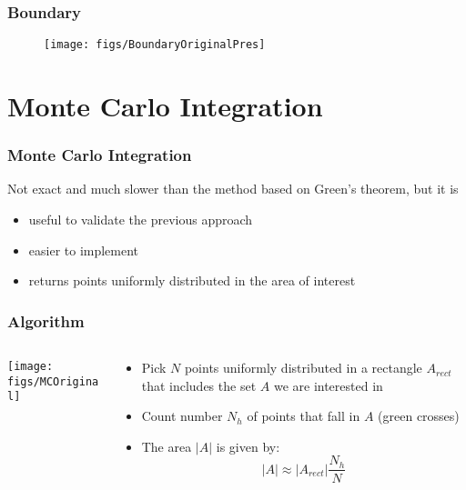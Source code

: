 \documentclass{beamer}
\begin{document}
\begin{frame}
\frametitle{Boundary}

\begin{figure}[!ht]
  \centering
  \texttt{[image: figs/BoundaryOriginalPres]}
\label{fig:boundary}
\end{figure}

\end{frame}


\section{Monte Carlo Integration}

\begin{frame}
\frametitle{Monte Carlo Integration}
Not exact and much slower than the method based on Green's theorem, but it is
\begin{itemize}
\item useful to validate the previous approach
\item easier to implement
\item returns points uniformly distributed in the area of interest
\end{itemize}
\end{frame}

\begin{frame}
\frametitle{Algorithm}

\begin{columns}
\begin{column}{0.48\textwidth}
\texttt{[image: figs/MCOriginal]}
\end{column}

\begin{column}{0.52\textwidth}

\begin{itemize}
\item Pick $N$ points uniformly distributed in a rectangle $A_{rect}$ that includes the set $A$ we are interested in
\item Count number $N_{h}$ of points that fall in $A$ (green crosses)
\item The area $|A|$ is given by:
$$
|A|\approx|A_{rect}|\frac{N_h}{N}
$$
\end{itemize}

\end{column}
\end{columns}
\end{frame}
\end{document}
